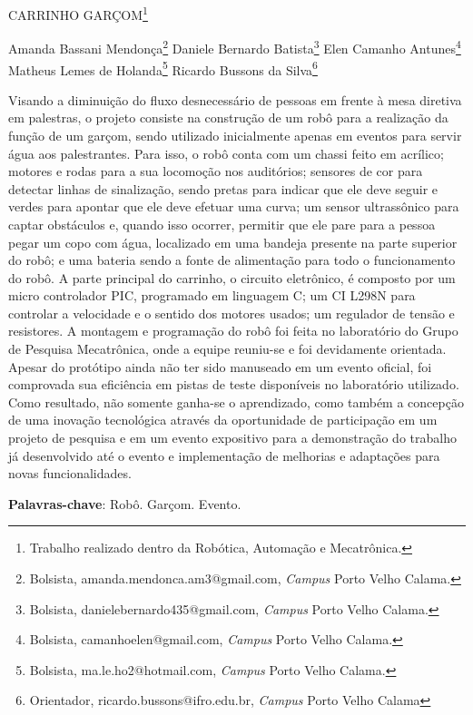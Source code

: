 \documentclass[article,12pt,onesidea,4paper,english,brazil]{abntex2}
\begin{document}
	
	
	\frenchspacing 
	
	\begin{center}
		\LARGE CARRINHO GARÇOM\footnote{Trabalho realizado dentro da Robótica, Automação e Mecatrônica.}
		
		\normalsize
		Amanda Bassani Mendonça\footnote{Bolsista, amanda.mendonca.am3@gmail.com, \textit{Campus} Porto Velho Calama.} 
		Daniele Bernardo Batista\footnote{Bolsista, danielebernardo435@gmail.com, \textit{Campus} Porto Velho Calama.} 
		Elen Camanho Antunes\footnote{Bolsista, camanhoelen@gmail.com, \textit{Campus} Porto Velho Calama.} \\
		Matheus Lemes de Holanda\footnote{Bolsista, ma.le.ho2@hotmail.com, \textit{Campus} Porto Velho Calama.}
		Ricardo Bussons da Silva\footnote{Orientador, ricardo.bussons@ifro.edu.br, \textit{Campus} Porto Velho Calama} 
	\end{center}
	
	\noindent Visando a diminuição do fluxo desnecessário de pessoas em frente à mesa diretiva
	em palestras, o projeto consiste na construção de um robô para a realização da
	função de um garçom, sendo utilizado inicialmente apenas em eventos para servir
	água aos palestrantes. Para isso, o robô conta com um chassi feito em acrílico;
	motores e rodas para a sua locomoção nos auditórios; sensores de cor para detectar
	linhas de sinalização, sendo pretas para indicar que ele deve seguir e verdes para
	apontar que ele deve efetuar uma curva; um sensor ultrassônico para captar
	obstáculos e, quando isso ocorrer, permitir que ele pare para a pessoa pegar um
	copo com água, localizado em uma bandeja presente na parte superior do robô; e
	uma bateria sendo a fonte de alimentação para todo o funcionamento do robô. A
	parte principal do carrinho, o circuito eletrônico, é composto por um micro
	controlador PIC, programado em linguagem C; um CI L298N para controlar a
	velocidade e o sentido dos motores usados; um regulador de tensão e resistores. A
	montagem e programação do robô foi feita no laboratório do Grupo de Pesquisa
	Mecatrônica, onde a equipe reuniu-se e foi devidamente orientada. Apesar do
	protótipo ainda não ter sido manuseado em um evento oficial, foi comprovada sua
	eficiência em pistas de teste disponíveis no laboratório utilizado. Como resultado,
	não somente ganha-se o aprendizado, como também a concepção de uma inovação
	tecnológica através da oportunidade de participação em um projeto de pesquisa e
	em um evento expositivo para a demonstração do trabalho já desenvolvido até o
	evento e implementação de melhorias e adaptações para novas funcionalidades.
	
	\vspace{\onelineskip}
	
	\noindent
	\textbf{Palavras-chave}: Robô. Garçom. Evento.
	
\end{document}
